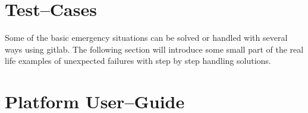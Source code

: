 \chapter{Test--Cases} \label{chp:test-cases}
	Some of the basic emergency situations can be solved or handled with several ways using \gls{gitlab}. The following section will introduce some small part of the real life examples of unexpected failures with step by step handling solutions.
	
%	
\chapter{Platform User--Guide} \label{chp:platform-user-guide}
	
	
	

